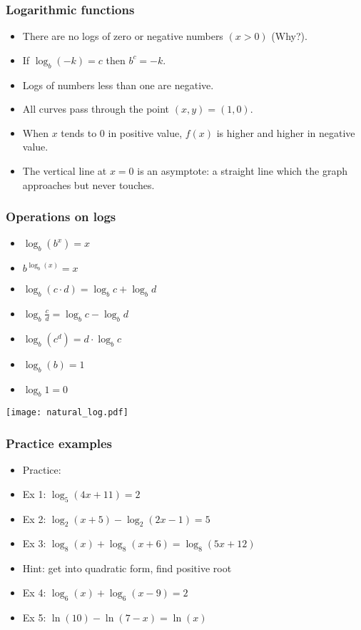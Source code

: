 \documentclass[xcolor=dvipsnames, 9pt]{beamer} %
\begin{document}
\begin{frame}
\frametitle{Logarithmic functions}
\begin{itemize}
\item There are no logs of zero or negative numbers $( x > 0)$ (Why?).
\item If $\log_b(-k) = c$ then $b^c = -k$. 
\item Logs of numbers less than one are negative. 
\item All curves pass through the point $(x, y) = (1, 0)$.
\item When $x$ tends to $0$ in positive value, $f(x)$ is higher and higher in negative value.
\item The vertical line at $x = 0$ is an asymptote: a straight line which the graph approaches but never touches. 
\end{itemize}
\end{frame}

\begin{frame}
\frametitle{Operations on logs}
\begin{multicols}{2}
\begin{itemize}
\setlength\itemsep{1em}
\item $\log_b(b^x) = x$
\item $b^{\log_b(x)}=x$
\item $\log_b(c \cdot d) = \log_b c + \log_b d$
\item $\log_b \frac{c}{d} = \log_b c - \log_b d$
\item $\log_b(c^d) = d \cdot \log_b c$
\item $\log_b(b) = 1$
\item $\log_b 1 = 0$
\end{itemize}
\end{multicols}
\begin{center}
\hspace*{-1cm} \texttt{[image: natural\_log.pdf]}
\end{center}
\end{frame}

\begin{frame}
\frametitle{Practice examples}

\begin{itemize}
	\setlength\itemsep{1em}
\item[] Practice:
\item Ex 1: $\log_5(4x+11) = 2$
\item Ex 2: $\log_2(x+5) - \log_2(2x-1) =5$
\item Ex 3: $\log_8(x) + \log_8(x+6) = \log_8(5x+12)$ 
\item[] Hint: get into quadratic form, find positive root
\item Ex 4: $\log_6(x) + \log_6(x - 9) = 2$
\item Ex 5: $\ln (10) - \ln (7-x) = \ln (x)$
\end{itemize}
\end{frame}
\end{document}
